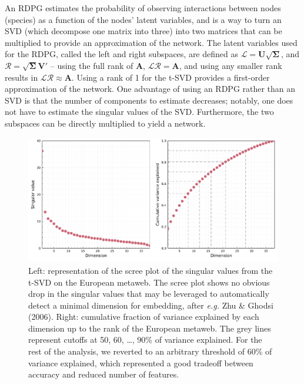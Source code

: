 \documentclass[10pt,oneside]{article}
\makeatletter
\def\maxwidth{\ifdim\Gin@nat@width>\linewidth\linewidth
\else\Gin@nat@width\fi}
\let\Oldincludegraphics\includegraphics
\renewcommand{\includegraphics}[1]{\Oldincludegraphics[width=\maxwidth]{#1}}
\makeatother
\begin{document}
An RDPG estimates the probability of observing interactions between
nodes (species) as a function of the nodes' latent variables, and is a
way to turn an SVD (which decompose one matrix into three) into two
matrices that can be multiplied to provide an approximation of the
network. The latent variables used for the RDPG, called the left and
right subspaces, are defined as
\(\mathscr{L} = \mathbf{U}\sqrt{\mathbf{\Sigma}}\), and
\(\mathscr{R} = \sqrt{\mathbf{\Sigma}}\mathbf{V}'\) -- using the full
rank of \(\mathbf{A}\), \(\mathscr{L}\mathscr{R} = \mathbf{A}\), and
using any smaller rank results in
\(\mathscr{L}\mathscr{R} \approx \mathbf{A}\). Using a rank of 1 for the
t-SVD provides a first-order approximation of the network. One advantage
of using an RDPG rather than an SVD is that the number of components to
estimate decreases; notably, one does not have to estimate the singular
values of the SVD. Furthermore, the two subspaces can be directly
multiplied to yield a network.

\begin{figure}
\hypertarget{fig:scree}{%
\centering
\includegraphics{figures/figure-screeplot.png}
\caption{Left: representation of the scree plot of the singular values
from the t-SVD on the European metaweb. The scree plot shows no obvious
drop in the singular values that may be leveraged to automatically
detect a minimal dimension for embedding, after \emph{e.g.} Zhu \&
Ghodsi (2006). Right: cumulative fraction of variance explained by each
dimension up to the rank of the European metaweb. The grey lines
represent cutoffs at 50, 60, \ldots, 90\% of variance explained. For the
rest of the analysis, we reverted to an arbitrary threshold of 60\% of
variance explained, which represented a good tradeoff between accuracy
and reduced number of features.}\label{fig:scree}
}
\end{figure}
\end{document}
